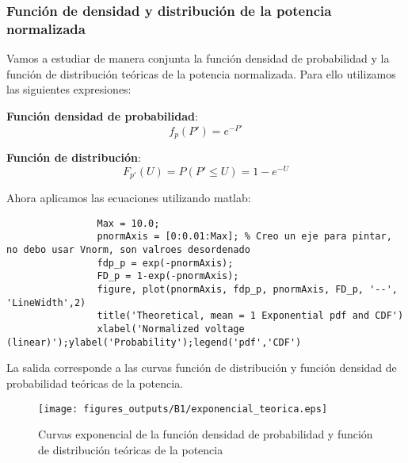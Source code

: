 \documentclass{article}
\begin{document}
        \subsubsection{Función de densidad y distribución de la potencia normalizada}
            \par Vamos a estudiar de manera conjunta la función densidad de probabilidad y la función de distribución teóricas de la potencia normalizada. Para ello utilizamos las siguientes expresiones:
            \par \textbf{Función densidad de probabilidad}:
                \begin{equation}
                    \tag{Función densidad de probabilidad}
                    f_p (P') = e^{-P'}
                \end{equation}
            \par \textbf{Función de distribución}:
                \begin{equation}
                    \tag{Función de distribución}
                    F_{p'}(U) = P(P' \leq U ) = 1-e^{-U}
                \end{equation}
            \par Ahora aplicamos las ecuaciones utilizando matlab:
            \begin{lstlisting}
                Max = 10.0;
                pnormAxis = [0:0.01:Max]; % Creo un eje para pintar, no debo usar Vnorm, son valroes desordenado
                fdp_p = exp(-pnormAxis);
                FD_p = 1-exp(-pnormAxis);
                figure, plot(pnormAxis, fdp_p, pnormAxis, FD_p, '--', 'LineWidth',2)
                title('Theoretical, mean = 1 Exponential pdf and CDF')
                xlabel('Normalized voltage (linear)');ylabel('Probability');legend('pdf','CDF')
            \end{lstlisting}
            \par La salida corresponde a las curvas función de distribución y función densidad de probabilidad teóricas de la potencia.
            \begin{figure}[h]
                \centering
                \texttt{[image: figures\_outputs/B1/exponencial\_teorica.eps]}
                \caption{Curvas exponencial de la función densidad de probabilidad y función de distribución teóricas de la potencia}
                \label{fig:my_label}
            \end{figure}
\end{document}
